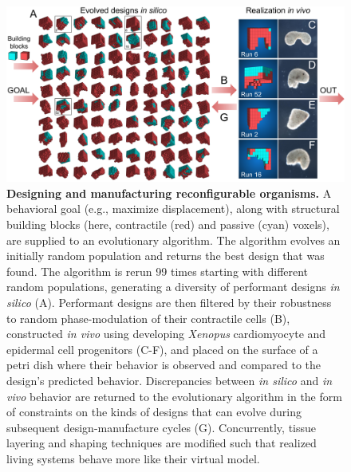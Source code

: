 



\begin{figure}[t]
\centering
\includegraphics[width=\linewidth]{Chapter07/img/Fig1}
\caption{\textbf{Designing and manufacturing reconfigurable organisms.} A behavioral goal (e.g., maximize displacement), along with structural building blocks (here, contractile (red) and passive (cyan) voxels), are supplied to an evolutionary algorithm. The algorithm evolves an initially random population and returns the best design that was found. The algorithm is rerun 99 times starting with different random populations, generating a diversity of performant designs \textit{in silico} (A). Performant designs are then filtered by their robustness to random phase-modulation of their contractile cells (B), constructed \textit{in vivo} using developing \textit{Xenopus} cardiomyocyte and epidermal cell progenitors (C-F), and placed on the surface of a petri dish where their behavior is observed and compared to the design's predicted behavior. Discrepancies between \textit{in silico} and \textit{in vivo} behavior are returned to the evolutionary algorithm in the form of constraints on the kinds of designs that can evolve during subsequent design-manufacture cycles (G). Concurrently, tissue layering and shaping techniques are modified such that realized living systems behave more like their virtual model.
}
\end{figure}


